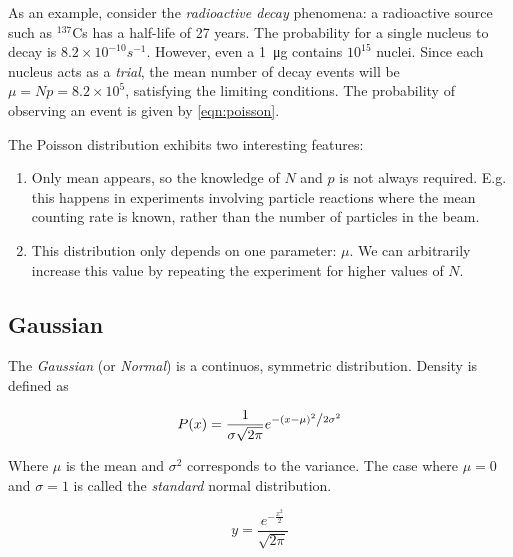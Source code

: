 
As an example, consider the \textit{radioactive decay} phenomena: a radioactive source such as $^{137}$Cs has a half-life of 27 years. The probability for a single nucleus to decay is $8.2 \times 10^{-10}s^{-1}$. However, even a \SI{1}{\micro\gram} contains $10^{15}$ nuclei. Since each nucleus acts as a \textit{trial}, the mean number of decay events will be $\mu = N p = 8.2 \times 10^5$, satisfying the limiting conditions. The probability of observing an event is given by \ref{eqn:poisson}.

The Poisson distribution exhibits two interesting features:

\begin{enumerate}
	\item Only mean appears, so the knowledge of $N$ and $p$ is not always required. E.g. this happens in experiments involving particle reactions where the mean counting rate is known, rather than the number of particles in the beam.

	\item This distribution only depends on one parameter: $\mu$. We can arbitrarily increase this value by repeating the experiment for higher values of $N$.
\end{enumerate}

\subsection{Gaussian}
\label{eqn:gaussian}


The \textit{Gaussian} (or \textit{Normal}) is a continuos, symmetric distribution. Density is defined as

\begin{equation}
	P(x) = \frac{1}{{\sigma \sqrt {2\pi } }}e^{{{ - \left( {x - \mu } \right)^2 } \mathord{\left/ {\vphantom {{ - \left( {x - \mu } \right)^2 } {2\sigma ^2 }}} \right. \kern-\nulldelimiterspace} {2\sigma ^2 }}}
\end{equation}

Where $\mu$ is the mean and $\sigma ^2$ corresponds to the variance. The case where $\mu = 0$ and $\sigma = 1$ is called the \textit{standard} normal distribution.

\begin{equation}
	y = \frac{e^{ - \frac{{x^2 }}{2}}}{{\sqrt {2\pi } }}
\end{equation}

